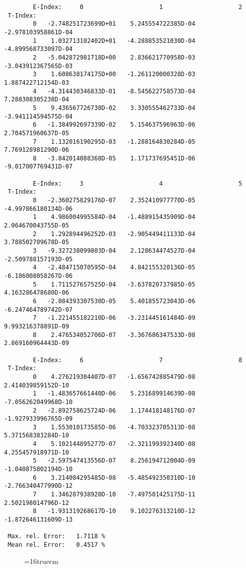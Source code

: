 \documentclass[12pt]{article}
\begin{document}
\begin{small}\begin{verbatim}
        E-Index:     0                     1                     2
 T-Index:
        0   -2.748251723699D+01    5.245554722385D-04   -2.978103958861D-04
        1    1.032713102402D+01   -4.288853521030D-04   -4.899568733097D-04
        2   -5.042872981718D+00    2.836621770958D-03   -3.043912367565D-03
        3    1.608638174175D+00   -1.261120000328D-03    1.887422712154D-03
        4   -4.314430346833D-01   -8.545622758573D-04    7.288308305238D-04
        5    9.436567726730D-02    3.330555462733D-04   -3.941114594575D-04
        6   -1.384992697339D-02    5.154637596963D-06    2.704571960637D-05
        7    1.132016190295D-03   -1.288164830284D-05    7.769128981290D-06
        8   -3.842014088368D-05    1.171737695451D-06   -9.017007769431D-07

        E-Index:     3                     4                     5
 T-Index:
        0   -2.360275829176D-07    2.352410977770D-05   -4.997866180134D-06
        1    4.986004995584D-04   -1.488915435909D-04    2.064670043755D-05
        2    1.292894496252D-03   -2.905449411133D-04    3.788502709678D-05
        3   -9.327238099803D-04    2.128634474527D-04   -2.509788157193D-05
        4   -2.484715070595D-04    4.842155320136D-05   -6.186008058267D-06
        5    1.711527657525D-04   -3.637820737985D-05    4.163286478680D-06
        6   -2.084393307530D-05    5.401855723043D-06   -6.247464789742D-07
        7   -1.221455182210D-06   -3.231445161484D-09    9.993216378891D-09
        8    2.476534052706D-07   -3.367686347533D-08    2.869160964443D-09

        E-Index:     6                     7                     8
 T-Index:
        0    4.276219304407D-07   -1.656742885479D-08    2.414039859152D-10
        1   -1.483657661440D-06    5.231689914639D-08   -7.056262049968D-10
        2   -2.892758625724D-06    1.174418148176D-07   -1.927933996765D-09
        3    1.553010173585D-06   -4.703323705313D-08    5.371568383284D-10
        4    5.102144895277D-07   -2.321199392340D-08    4.255457918971D-10
        5   -2.597547413556D-07    8.256194712004D-09   -1.040875802194D-10
        6    3.214084295485D-08   -5.485492350310D-10   -2.766340477990D-12
        7    1.346287938920D-10   -7.497501425175D-11    2.502198014796D-12
        8   -1.931319268617D-10    9.102276313210D-12   -1.872646131609D-13

 Max. rel. Error:   1.7118 %
 Mean rel. Error:   0.4517 %

\end{verbatim}\end{small}
\begin{figure} \label{2.2.5}
\epsfxsize=16truecm
\end{figure}
\newpage
\end{document}
